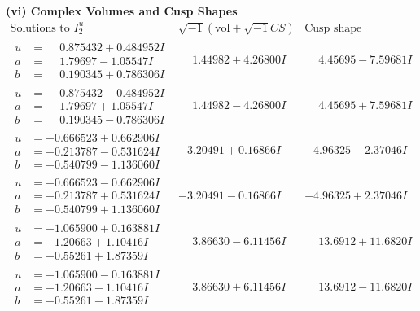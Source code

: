 \documentclass[1p]{elsarticle_modified}
\theoremstyle{definition}
\newcommand{\I}{\sqrt{-1}}
\begin{document}
\newpage\flushleft \textbf{(vi) Complex Volumes and Cusp Shapes}
$$\begin{array}{c|c|c}  
\text{Solutions to }I^u_{2}& \I (\text{vol} + \sqrt{-1}CS) & \text{Cusp shape}\\
 \hline 
\begin{aligned}
u &= \phantom{-}0.875432 + 0.484952 I \\
a &= \phantom{-}1.79697 - 1.05547 I \\
b &= \phantom{-}0.190345 + 0.786306 I\end{aligned}
 & \phantom{-}1.44982 + 4.26800 I & \phantom{-}4.45695 - 7.59681 I \\ \hline\begin{aligned}
u &= \phantom{-}0.875432 - 0.484952 I \\
a &= \phantom{-}1.79697 + 1.05547 I \\
b &= \phantom{-}0.190345 - 0.786306 I\end{aligned}
 & \phantom{-}1.44982 - 4.26800 I & \phantom{-}4.45695 + 7.59681 I \\ \hline\begin{aligned}
u &= -0.666523 + 0.662906 I \\
a &= -0.213787 - 0.531624 I \\
b &= -0.540799 - 1.136060 I\end{aligned}
 & -3.20491 + 0.16866 I & -4.96325 - 2.37046 I \\ \hline\begin{aligned}
u &= -0.666523 - 0.662906 I \\
a &= -0.213787 + 0.531624 I \\
b &= -0.540799 + 1.136060 I\end{aligned}
 & -3.20491 - 0.16866 I & -4.96325 + 2.37046 I \\ \hline\begin{aligned}
u &= -1.065900 + 0.163881 I \\
a &= -1.20663 + 1.10416 I \\
b &= -0.55261 + 1.87359 I\end{aligned}
 & \phantom{-}3.86630 - 6.11456 I & \phantom{-}13.6912 + 11.6820 I \\ \hline\begin{aligned}
u &= -1.065900 - 0.163881 I \\
a &= -1.20663 - 1.10416 I \\
b &= -0.55261 - 1.87359 I\end{aligned}
 & \phantom{-}3.86630 + 6.11456 I & \phantom{-}13.6912 - 11.6820 I \\ \hline\begin{aligned}

\end{aligned}
\end{array}$$
\end{document}
